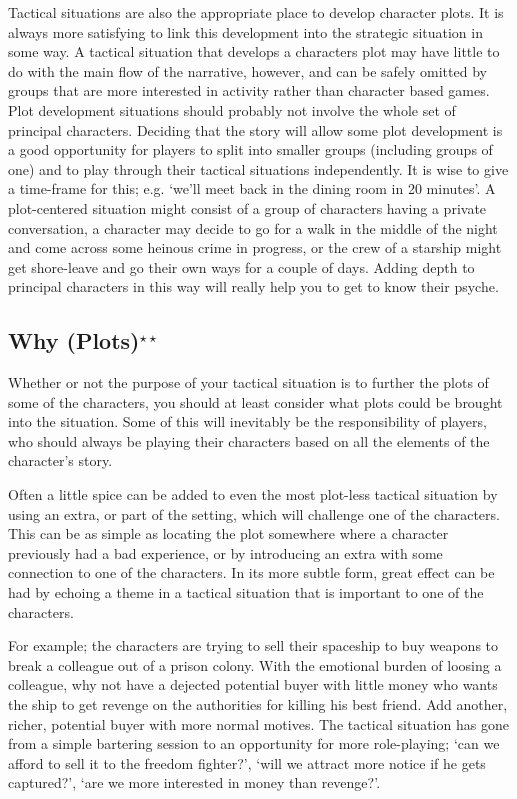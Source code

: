\documentclass[twoside]{book}
\begin{document}
Tactical situations are also the appropriate place to develop
character plots. It is always more satisfying to link this development
into the strategic situation in some way. A tactical situation that
develops a characters plot may have little to do with the main flow of
the narrative, however, and can be safely omitted by groups that are
more interested in activity rather than character based games. Plot
development situations should probably not involve the whole set of
principal characters. Deciding that the story will allow some plot
development is a good opportunity for players to split into smaller
groups (including groups of one) and to play through their tactical
situations independently. It is wise to give a time-frame for this;
e.g. `we'll meet back in the dining room in 20 minutes'. A
plot-centered situation might consist of a group of characters having a
private conversation, a character may decide to go for a walk in the
middle of the night and come across some heinous crime in progress, or
the crew of a starship might get shore-leave and go their own ways for
a couple of days. Adding depth to principal characters in this way
will really help you to get to know their psyche.

\subsection{Why (Plots)$^{\star\star}$} %

Whether or not the purpose of your tactical situation is to further
the plots of some of the characters, you should at least consider what
plots could be brought into the situation. Some of this will
inevitably be the responsibility of players, who should always be
playing their characters based on all the elements of the character's
story.

Often a little spice can be added to even the most plot-less tactical
situation by using an extra, or part of the setting, which will
challenge one of the characters. This can be as simple as locating the
plot somewhere where a character previously had a bad experience, or
by introducing an extra with some connection to one of the
characters. In its more subtle form, great effect can be had by
echoing a theme in a tactical situation that is important to one of
the characters.

For example; the characters are trying to sell their spaceship to buy
weapons to break a colleague out of a prison colony. With the
emotional burden of loosing a colleague, why not have a dejected
potential buyer with little money who wants the ship to get revenge on
the authorities for killing his best friend. Add another, richer,
potential buyer with more normal motives. The tactical situation has
gone from a simple bartering session to an opportunity for more
role-playing; `can we afford to sell it to the freedom fighter?',
`will we attract more notice if he gets captured?', `are we more
interested in money than revenge?'.
\end{document}
